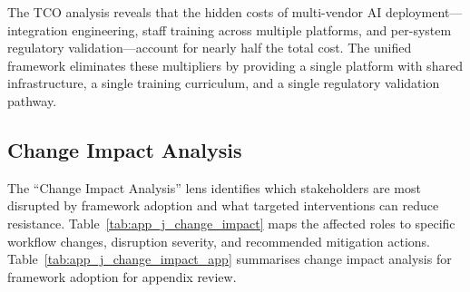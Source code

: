 The TCO analysis reveals that the hidden costs of multi-vendor AI deployment---integration engineering, staff training across multiple platforms, and per-system regulatory validation---account for nearly half the total cost. The unified framework eliminates these multipliers by providing a single platform with shared infrastructure, a single training curriculum, and a single regulatory validation pathway.

\subsection{Change Impact Analysis}

The ``Change Impact Analysis'' lens identifies which stakeholders are most disrupted by framework adoption and what targeted interventions can reduce resistance. Table~\ref{tab:app_j_change_impact} maps the affected roles to specific workflow changes, disruption severity, and recommended mitigation actions.
\noindent Table~\ref{tab:app_j_change_impact_app} summarises change impact analysis for framework adoption for appendix review.

